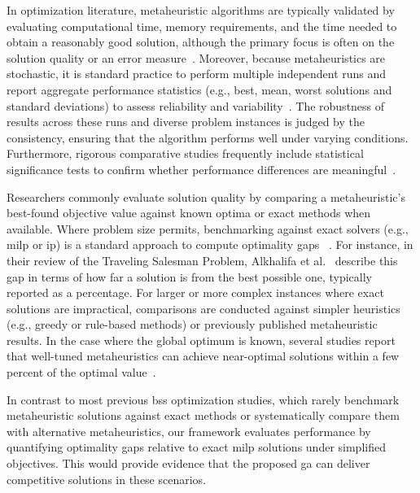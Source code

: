 In optimization literature, metaheuristic algorithms are typically validated by evaluating computational time, memory requirements, and the time needed to obtain a reasonably good solution, although the primary focus is often on the solution quality or an error measure~\cite{Osaba2021}. Moreover, because metaheuristics are stochastic, it is standard practice to perform multiple independent runs and report aggregate performance statistics (e.g., best, mean, worst solutions and standard deviations) to assess reliability and variability~\cite{Osaba2021}. The robustness of results across these runs and diverse problem instances is judged by the consistency, ensuring that the algorithm performs well under varying conditions. Furthermore, rigorous comparative studies frequently include statistical significance tests to confirm whether performance differences are meaningful~\cite{Derrac2011, Danka2013}.

Researchers commonly evaluate solution quality by comparing a metaheuristic's best-found objective value against known optima or exact methods when available. Where problem size permits, benchmarking against exact solvers (e.g., \ac{milp} or \ac{ip}) is a standard approach to compute optimality gaps ~\cite{Roshanaei2010}. For instance, in their review of the Traveling Salesman Problem, Alkhalifa et al.~\cite{Alkhalifa2025} describe this gap in terms of how far a solution is from the best possible one, typically reported as a percentage. For larger or more complex instances where exact solutions are impractical, comparisons are conducted against simpler heuristics (e.g., greedy or rule-based methods) or previously published metaheuristic results. In the case where the global optimum is known, several studies report that well-tuned metaheuristics can achieve near-optimal solutions within a few percent of the optimal value~\cite{Helsgaun2000, JohnsonMcGeoch2003, Schwinn2018}.

In contrast to most previous \ac{bss} optimization studies, which rarely benchmark metaheuristic solutions against exact methods or systematically compare them with alternative metaheuristics, our framework evaluates performance by quantifying optimality gaps relative to exact \ac{milp} solutions under simplified objectives. This would provide evidence that the proposed \ac{ga} can deliver competitive solutions in these scenarios.